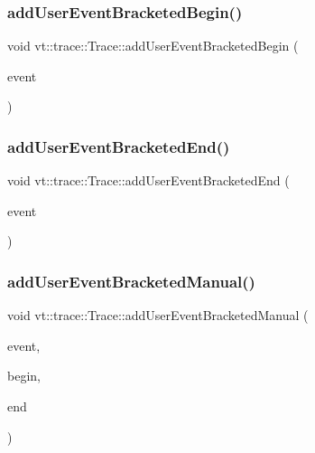 \mbox{\label{structvt_1_1trace_1_1_trace_a1264ea508298bfeb6a6ef5e06d9214f9}} 
\subsubsection{\texorpdfstring{add\+User\+Event\+Bracketed\+Begin()}{addUserEventBracketedBegin()}}
{\footnotesize\ttfamily void vt\+::trace\+::\+Trace\+::add\+User\+Event\+Bracketed\+Begin (\begin{DoxyParamCaption}\item[{\hyperlink{namespacevt_1_1trace_a5908920d051c144c89f17c69ed262350}{User\+Event\+I\+D\+Type}}]{event }\end{DoxyParamCaption})}

\mbox{\label{structvt_1_1trace_1_1_trace_a9ed44cd0fb5939013ae30de2aeb8aa0e}} 
\subsubsection{\texorpdfstring{add\+User\+Event\+Bracketed\+End()}{addUserEventBracketedEnd()}}
{\footnotesize\ttfamily void vt\+::trace\+::\+Trace\+::add\+User\+Event\+Bracketed\+End (\begin{DoxyParamCaption}\item[{\hyperlink{namespacevt_1_1trace_a5908920d051c144c89f17c69ed262350}{User\+Event\+I\+D\+Type}}]{event }\end{DoxyParamCaption})}

\mbox{\label{structvt_1_1trace_1_1_trace_ab0dd676ca3870682b0c52669d3603c11}} 
\subsubsection{\texorpdfstring{add\+User\+Event\+Bracketed\+Manual()}{addUserEventBracketedManual()}}
{\footnotesize\ttfamily void vt\+::trace\+::\+Trace\+::add\+User\+Event\+Bracketed\+Manual (\begin{DoxyParamCaption}\item[{\hyperlink{namespacevt_1_1trace_a70c43e0e1596eea236912d4197d3120a}{User\+Spec\+Event\+I\+D\+Type}}]{event,  }\item[{double}]{begin,  }\item[{double}]{end }\end{DoxyParamCaption})}

